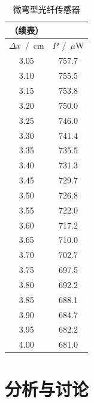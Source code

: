 \documentclass[a4paper]{article}%
\begin{document}
\begin{table}[H]
\begin{minipage}{0.2\linewidth}
    \centering
    \begin{tabular}{cc}
      （续表）\\
        \toprule
        $\Delta x$~/~cm & $P$~/~$\mu$W\\
        \midrule
        3.05 	&	757.7 	\\
        3.10 	&	755.5 	\\
        3.15 	&	753.8 	\\
        3.20 	&	750.0 	\\
        3.25 	&	746.0 	\\
        3.30 	&	741.4 	\\
        3.35 	&	735.5 	\\
        3.40 	&	731.3 	\\
        3.45 	&	729.7 	\\
        3.50 	&	726.8 	\\
        3.55 	&	722.0 	\\
        3.60 	&	717.2 	\\
        3.65 	&	710.0 	\\
        3.70 	&	702.7 	\\
        3.75 	&	697.5 	\\
        3.80 	&	692.2 	\\
        3.85 	&	688.1 	\\
        3.90 	&	684.7 	\\
        3.95 	&	682.2 	\\
        4.00 	&	681.0 	\\
        \bottomrule
    \end{tabular}
    \end{minipage}
    \caption{微弯型光纤传感器}\label{004}
\end{table}

\section{分析与讨论}
\end{document}
